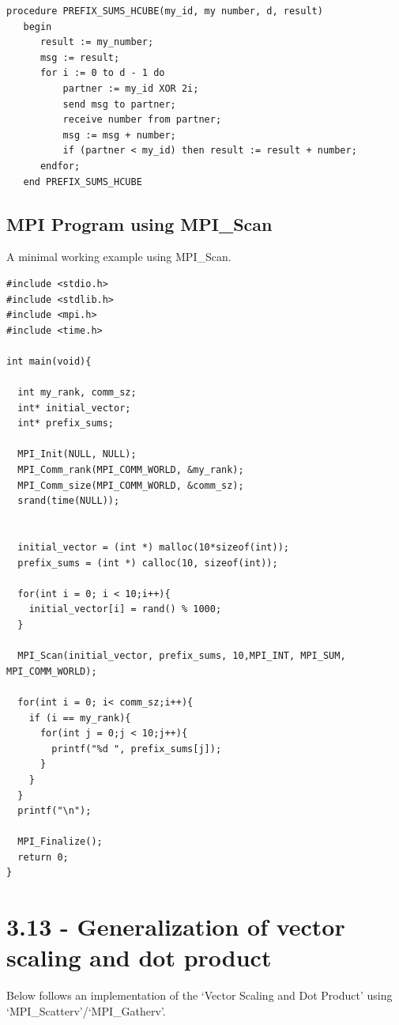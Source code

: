 \documentclass[a4paper,11pt,twoside]{article}
\begin{document}
\begin{verbatim}
procedure PREFIX_SUMS_HCUBE(my_id, my number, d, result) 
   begin 
      result := my_number; 
      msg := result; 
      for i := 0 to d - 1 do 
          partner := my_id XOR 2i; 
          send msg to partner; 
          receive number from partner; 
          msg := msg + number; 
          if (partner < my_id) then result := result + number; 
      endfor; 
   end PREFIX_SUMS_HCUBE
\end{verbatim}



\subsection*{MPI Program using MPI\_Scan}
A minimal working example using MPI\_Scan.
\begin{verbatim}
#include <stdio.h>
#include <stdlib.h>
#include <mpi.h>
#include <time.h>

int main(void){

  int my_rank, comm_sz;
  int* initial_vector;
  int* prefix_sums;

  MPI_Init(NULL, NULL);
  MPI_Comm_rank(MPI_COMM_WORLD, &my_rank);
  MPI_Comm_size(MPI_COMM_WORLD, &comm_sz);
  srand(time(NULL));


  initial_vector = (int *) malloc(10*sizeof(int));
  prefix_sums = (int *) calloc(10, sizeof(int));

  for(int i = 0; i < 10;i++){
    initial_vector[i] = rand() % 1000;
  }

  MPI_Scan(initial_vector, prefix_sums, 10,MPI_INT, MPI_SUM, MPI_COMM_WORLD);

  for(int i = 0; i< comm_sz;i++){
    if (i == my_rank){
      for(int j = 0;j < 10;j++){
        printf("%d ", prefix_sums[j]);
      }
    }
  }
  printf("\n");

  MPI_Finalize();
  return 0;
}
\end{verbatim}

\section{3.13 - Generalization of vector scaling and dot product}

Below follows an implementation of the `Vector Scaling and Dot Product' using `MPI\_Scatterv'/`MPI\_Gatherv'.
\end{document}
